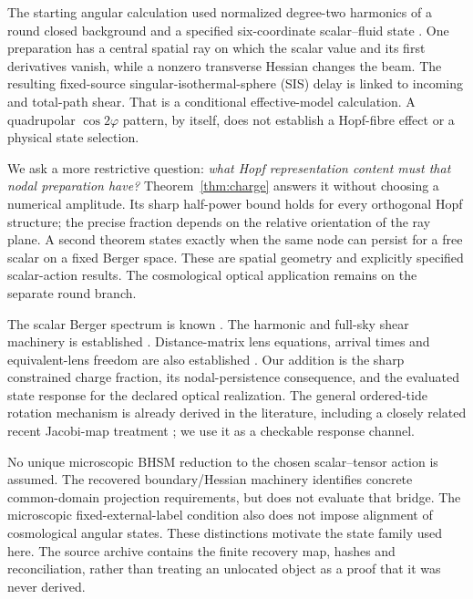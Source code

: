 \documentclass[11pt,a4paper]{article}
\begin{document}
The starting angular calculation used normalized degree-two harmonics of a
round closed background and a specified six-coordinate scalar--fluid state
\cite{Carberry2026EnvironmentalSource,Carberry2026TransportSource}.
One preparation has a central spatial ray on which the scalar value and
its first derivatives vanish, while a nonzero transverse Hessian changes
the beam. The resulting fixed-source singular-isothermal-sphere (SIS)
delay is linked to incoming and total-path shear. That is a conditional
effective-model calculation. A quadrupolar $\cos2\varphi$ pattern, by itself,
does not establish a Hopf-fibre effect or a physical state selection.

We ask a more restrictive question: \emph{what Hopf representation content
must that nodal preparation have?} Theorem~\ref{thm:charge} answers it
without choosing a numerical amplitude. Its sharp half-power bound holds
for every orthogonal Hopf structure; the precise fraction depends on the
relative orientation of the ray plane. A second theorem states exactly
when the same node can persist for a free scalar on a fixed Berger space.
These are spatial geometry and explicitly specified scalar-action results.
The cosmological optical application remains on the separate round branch.

The scalar Berger spectrum is known \cite{Lauret2019Berger}. The harmonic
and full-sky shear machinery is established
\cite{Lindblom2017Harmonics,Bernardeau2010FullSky}. Distance-matrix lens
equations, arrival times and equivalent-lens freedom are also established
\cite{Schneider1997Equivalent,Fleury2021Arbitrary,Schneider2019Multiplane}.
Our addition is the sharp constrained charge fraction, its nodal-persistence
consequence, and the evaluated state response for the declared optical
realization. The general ordered-tide rotation mechanism is already derived
in the literature, including a closely related recent Jacobi-map treatment
\cite{Magi2026Rotation}; we use it as a checkable response channel.

No unique microscopic BHSM reduction to the chosen scalar--tensor action
is assumed. The recovered boundary/Hessian machinery identifies concrete
common-domain projection requirements, but does not evaluate that bridge.
The microscopic fixed-external-label condition also does not impose
alignment of cosmological angular states. These distinctions motivate the
state family used here. The source archive contains the finite recovery map,
hashes and reconciliation, rather than treating an unlocated object as a
proof that it was never derived.
\end{document}
